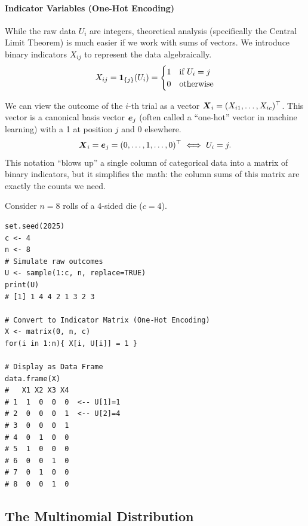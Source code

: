 \paragraph{Indicator Variables (One-Hot Encoding)}
While the raw data $U_i$ are integers, theoretical analysis (specifically the Central Limit Theorem) is much easier if we work with sums of vectors. We introduce binary indicators $X_{ij}$ to represent the data algebraically.
\[
    X_{ij} = \boldsymbol{1}_{\{j\}}(U_i) = \begin{cases}
        1 & \text{if } U_i = j \\
        0 & \text{otherwise}
    \end{cases}
\]


We can view the outcome of the $i$-th trial as a vector $\boldsymbol{X}_i = (X_{i1}, \dots, X_{ic})^\top$. This vector is a canonical basis vector $\boldsymbol{e}_j$ (often called a ``one-hot'' vector in machine learning) with a 1 at position $j$ and 0 elsewhere.
\[
    \boldsymbol{X}_i = \boldsymbol{e}_j = (0, \dots, 1, \dots, 0)^\top \iff U_i = j.
\]
This notation ``blows up'' a single column of categorical data into a matrix of binary indicators, but it simplifies the math: the column sums of this matrix are exactly the counts we need.

\begin{ex}
    Consider $n=8$ rolls of a 4-sided die ($c=4$).
    \begin{verbatim}
set.seed(2025)
c <- 4
n <- 8
# Simulate raw outcomes
U <- sample(1:c, n, replace=TRUE)
print(U)
# [1] 1 4 4 2 1 3 2 3

# Convert to Indicator Matrix (One-Hot Encoding)
X <- matrix(0, n, c)
for(i in 1:n){ X[i, U[i]] = 1 }

# Display as Data Frame
data.frame(X)
#   X1 X2 X3 X4
# 1  1  0  0  0  <-- U[1]=1
# 2  0  0  0  1  <-- U[2]=4
# 3  0  0  0  1
# 4  0  1  0  0
# 5  1  0  0  0
# 6  0  0  1  0
# 7  0  1  0  0
# 8  0  0  1  0
    \end{verbatim}
\end{ex}

\subsection{The Multinomial Distribution}
\label{sub:Multinomial Distribution}

